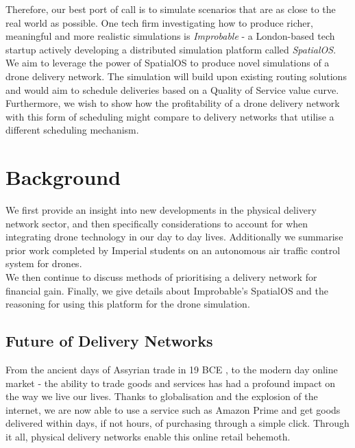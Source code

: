 \documentclass[a4paper,11pt,titlepage]{report}
\begin{document}
Therefore, our best port of call is to simulate scenarios that are as close to the real world as possible. One tech firm investigating how to produce richer, meaningful and more realistic simulations is \textit{Improbable}\cite{ImprobableWorldsLtd.2018a} - a London-based tech startup actively developing a distributed simulation platform called \textit{SpatialOS}\cite{ImprobableWorldsLtd.2018b}. \\

We aim to leverage the power of SpatialOS to produce novel simulations of a drone delivery network. The simulation will build upon existing routing solutions\cite{Balaji2017} and would aim to schedule deliveries based on a Quality of Service value curve. Furthermore, we wish to show how the profitability of a drone delivery network with this form of scheduling might compare to delivery networks that utilise a different scheduling mechanism.

\newpage
\chapter{Background}
We first provide an insight into new developments in the physical delivery network sector, and then specifically considerations to account for when integrating drone technology in our day to day lives. Additionally we summarise prior work completed by Imperial students on an autonomous air traffic control system for drones. \\

We then continue to discuss methods of prioritising a delivery network for financial gain. Finally, we give details about Improbable's SpatialOS and the reasoning for using this platform for the drone simulation.

\section{Future of Delivery Networks}
From the ancient days of Assyrian trade in 19 BCE \cite{stearns2001the}, to the modern day online market - the ability to trade goods and services has had a profound impact on the way we live our lives. Thanks to globalisation and the explosion of the internet, we are now able to use a service such as Amazon Prime and get goods delivered within days, if not hours, of purchasing through a simple click. Through it all, physical delivery networks enable this online retail behemoth. \\
\end{document}
